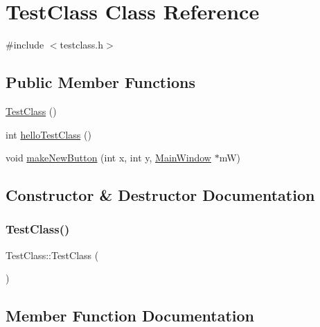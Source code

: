 \hypertarget{class_test_class}{}\section{Test\+Class Class Reference}
\label{class_test_class}


{\ttfamily \#include $<$testclass.\+h$>$}

\subsection*{Public Member Functions}
\begin{DoxyCompactItemize}
\item 
\mbox{\hyperlink{class_test_class_a09903432ed60c7c38f1beccc4cf18987}{Test\+Class}} ()
\item 
int \mbox{\hyperlink{class_test_class_a842a304e200248cadf04d06126b51124}{hello\+Test\+Class}} ()
\item 
void \mbox{\hyperlink{class_test_class_ab263a6dea1c83b8206d4fc029f4294fd}{make\+New\+Button}} (int x, int y, \mbox{\hyperlink{class_main_window}{Main\+Window}} $\ast$mW)
\end{DoxyCompactItemize}


\subsection{Constructor \& Destructor Documentation}
\mbox{\label{class_test_class_a09903432ed60c7c38f1beccc4cf18987}} 
\subsubsection{\texorpdfstring{Test\+Class()}{TestClass()}}
{\footnotesize\ttfamily Test\+Class\+::\+Test\+Class (\begin{DoxyParamCaption}{ }\end{DoxyParamCaption})}



\subsection{Member Function Documentation}
\mbox{\label{class_test_class_a842a304e200248cadf04d06126b51124}} 
